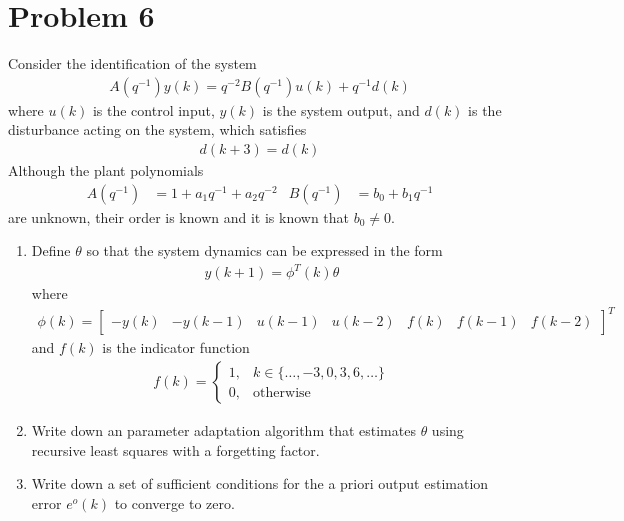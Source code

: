 \section*{Problem 6}

Consider the identification of the system
\begin{align*}
    A(q^{-1}) y(k) = q^{-2} B(q^{-1}) u(k) + q^{-1} d(k)
\end{align*}
where $u(k)$ is the control input, $y(k)$ is the system output, and $d(k)$ is the disturbance acting on the system, which satisfies
\begin{align*}
    d(k+3) = d(k)
\end{align*}
Although the plant polynomials
\begin{align*}
    A(q^{-1}) & = 1 + a_1 q^{-1} + a_2 q^{-2}
        & B(q^{-1}) & = b_0 + b_1 q^{-1}
\end{align*}
are unknown, their order is known and it is known that $b_0 \neq 0$.

\begin{enumerate}
    \item
    Define $\theta$ so that the system dynamics can be expressed in the form
    \begin{align*}
        y(k+1) = \phi^T(k) \theta
    \end{align*}
    where
    \begin{align*}
        \phi(k) = \begin{bmatrix}
                -y(k) & -y(k-1) & u(k-1) & u(k-2) & f(k) & f(k-1) & f(k-2)
            \end{bmatrix}^T
    \end{align*}
    and $f(k)$ is the indicator function
    \begin{align*}
        f(k) = \begin{cases}
                1, & k \in \{ \ldots, -3, 0, 3, 6, \ldots \} \\
                0, & \textrm{otherwise}
            \end{cases}
    \end{align*}

    \item
    Write down an parameter adaptation algorithm that estimates $\theta$ using recursive least squares with a forgetting factor.

    \item
    Write down a set of sufficient conditions for the a priori output estimation error $e^o(k)$ to converge to zero.

\end{enumerate}

